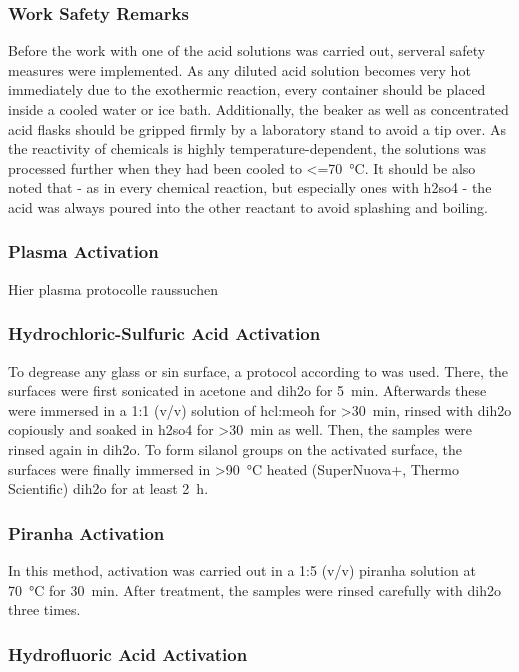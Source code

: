 \subsubsection{Work Safety Remarks}
Before the work with one of the acid solutions was carried out, serveral safety measures were implemented. As any diluted acid solution becomes very hot immediately due to the exothermic reaction, every container should be placed inside a cooled water or ice bath. Additionally, the beaker as well as concentrated acid flasks should be gripped firmly by a laboratory stand to avoid a tip over. As the reactivity of chemicals is highly temperature-dependent, the solutions was processed further when they had been cooled to \SI{<=70}{\degreeCelsius}. It should be also noted that - as in every chemical reaction, but especially ones with \gls{h2so4} - the acid was always poured into the other reactant to avoid splashing and boiling.

\subsubsection{Plasma Activation}

Hier plasma protocolle raussuchen

\subsubsection{Hydrochloric-Sulfuric Acid Activation}
To degrease any glass or \gls{sin} surface, a protocol according to \citet{lit:chem:Dressick} was used. There, the surfaces were first sonicated in acetone and \gls{dih2o}  for \SI{5}{\minute}. Afterwards these were immersed in a 1:1 (v/v) solution of \gls{hcl}:\gls{meoh} for \SI{>30}{\minute}, rinsed with \gls{dih2o} copiously and soaked in \gls{h2so4} for \SI{>30}{\minute} as well. Then, the samples were rinsed again in \acrlong{dih2o}. To form silanol groups on the activated surface, the surfaces were finally immersed in \SI{>90}{\degreeCelsius} heated (SuperNuova+, Thermo Scientific) \gls{dih2o}  for at least \SI{2}{\hour}.
\subsubsection{Piranha Activation}
In this method, activation was carried out in a 1:5 (v/v) \acrfull{piranha} solution at \SI{70}{\degreeCelsius} for \SI{30}{\minute}. After treatment, the samples were rinsed carefully with \gls{dih2o} three times.
\subsubsection{Hydrofluoric Acid Activation}

